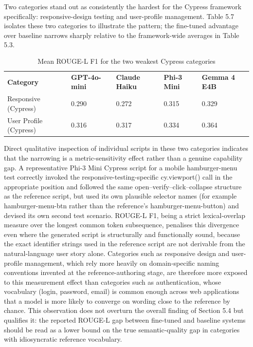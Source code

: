 Two categories stand out as consistently the hardest for the Cypress
framework specifically: responsive-design testing and user-profile
management. Table 5.7 isolates these two categories to illustrate the
pattern; the fine-tuned advantage over baseline narrows sharply relative
to the framework-wide averages in Table 5.3.

\begin{longtable}[]{@{}lllll@{}}
\caption{Mean ROUGE-L F1 for the two weakest Cypress categories}\tabularnewline
\toprule
\endhead
\textbf{Category} & \textbf{GPT-4o-mini} & \textbf{Claude Haiku} &
\textbf{Phi-3 Mini} & \textbf{Gemma 4 E4B} \\
Responsive (Cypress) & 0.290 & 0.272 & 0.315 & 0.329 \\
User Profile (Cypress) & 0.316 & 0.317 & 0.334 & 0.364 \\
\bottomrule
\end{longtable}

Direct qualitative inspection of individual scripts in these two
categories indicates that the narrowing is a metric-sensitivity effect
rather than a genuine capability gap. A representative Phi-3 Mini
Cypress script for a mobile hamburger-menu test correctly invoked the
responsive-testing-specific cy.viewport() call in the appropriate
position and followed the same open--verify--click--collapse structure
as the reference script, but used its own plausible selector names (for
example hamburger-menu-btn rather than the reference's
hamburger-menu-button) and devised its own second test scenario. ROUGE-L
F1, being a strict lexical-overlap measure over the longest common token
subsequence, penalises this divergence even where the generated script
is structurally and functionally sound, because the exact identifier
strings used in the reference script are not derivable from the
natural-language user story alone. Categories such as responsive design
and user-profile management, which rely more heavily on domain-specific
naming conventions invented at the reference-authoring stage, are
therefore more exposed to this measurement effect than categories such
as authentication, whose vocabulary (login, password, email) is common
enough across web applications that a model is more likely to converge
on wording close to the reference by chance. This observation does not
overturn the overall finding of Section 5.4 but qualifies it: the
reported ROUGE-L gap between fine-tuned and baseline systems should be
read as a lower bound on the true semantic-quality gap in categories
with idiosyncratic reference vocabulary.

